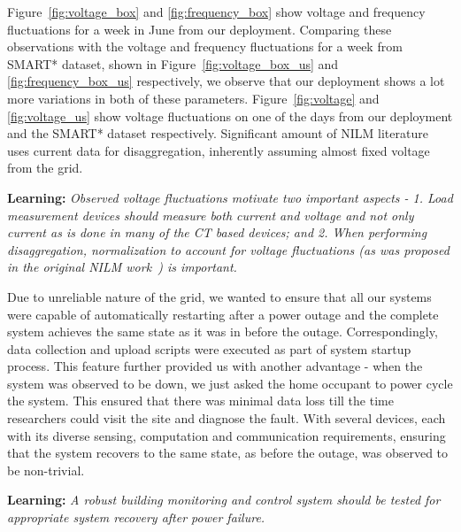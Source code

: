 \documentclass[10pt]{sensys-proc}
\newcommand{\redcolor}[1]{\textcolor{red}{#1}}
\newcommand{\figref}[1]{Figure~\ref{#1}}
\begin{document}
\figref{fig:voltage_box} and \ref{fig:frequency_box} show voltage and frequency fluctuations for a week in June from our deployment. Comparing these observations with the voltage and frequency fluctuations for a week from SMART* dataset, shown in \figref{fig:voltage_box_us} and \ref{fig:frequency_box_us} respectively, we observe that our deployment shows a lot more variations in both of these parameters. \figref{fig:voltage} and \ref{fig:voltage_us}  show voltage fluctuations on one of the days from our deployment and the SMART* dataset respectively. 
Significant amount of NILM literature uses current data
for disaggregation, inherently assuming almost fixed voltage from the grid. 

\textbf{Learning:} \emph{Observed voltage fluctuations motivate two important aspects - 1. Load measurement devices should measure both current and voltage and not only current as is done in many of the CT based devices; and 2. When performing disaggregation, normalization to account for voltage fluctuations (as was proposed in the original NILM work~\cite{hart}) is important.}

\noindent Due to unreliable nature of the grid, we wanted to ensure that all our systems were capable of automatically restarting after a power outage and the complete system achieves the same state as it was in before the outage. Correspondingly, data collection and upload scripts were executed as part of system startup process. This feature further provided us with another advantage - when the system was observed to be down, we just asked the home occupant to power cycle the system. This ensured that there was minimal data loss till the time researchers could visit the site and diagnose the fault. %
With several devices, each with its diverse sensing, computation and communication requirements, ensuring that the system recovers to the same state, as before the outage, was observed to be non-trivial. 

\textbf{Learning:} \emph{A robust building monitoring and control system should be tested for appropriate system recovery after power failure.}
\end{document}
